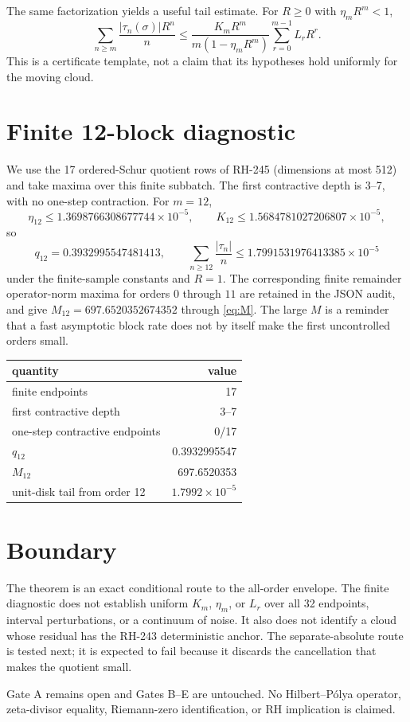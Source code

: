 \documentclass[11pt]{article}
\begin{document}
The same factorization yields a useful tail estimate.  For $R\ge0$ with
$\eta_mR^m<1$,
\begin{equation}\label{eq:tail}
 \sum_{n\ge m}\frac{|\tau_n(\sigma)|R^n}{n}
 \le
 \frac{K_mR^m}{m(1-\eta_mR^m)}
 \sum_{r=0}^{m-1}L_rR^r.
\end{equation}
This is a certificate template, not a claim that its hypotheses hold
uniformly for the moving cloud.

\section{Finite 12-block diagnostic}

We use the 17 ordered-Schur quotient rows of RH-245 (dimensions at most 512)
and take maxima over this finite subbatch.  The first contractive depth is
3--7, with no one-step contraction.  For $m=12$,
\[
 \eta_{12}\le1.3698766308677744\times10^{-5},\qquad
 K_{12}\le1.5684781027206807\times10^{-5},
\]
so
\[
 q_{12}=0.3932995547481413,
 \qquad
 \sum_{n\ge12}\frac{|\tau_n|}{n}
 \le1.7991531976413385\times10^{-5}
\]
under the finite-sample constants and $R=1$.  The corresponding finite
remainder operator-norm maxima for orders $0$ through $11$ are retained in
the JSON audit, and give $M_{12}=697.6520352674352$ through
\eqref{eq:M}.  The large $M$ is a reminder that a fast asymptotic block rate
does not by itself make the first uncontrolled orders small.

\begin{center}
\small
\begin{tabular}{lr}
\toprule
quantity & value\\
\midrule
finite endpoints & 17\\
first contractive depth & 3--7\\
one-step contractive endpoints & 0/17\\
$q_{12}$ & 0.3932995547\\
$M_{12}$ & 697.6520353\\
unit-disk tail from order 12 & $1.7992\times10^{-5}$\\
\bottomrule
\end{tabular}
\end{center}

\section{Boundary}

The theorem is an exact conditional route to the all-order envelope.  The
finite diagnostic does not establish uniform $K_m$, $\eta_m$, or $L_r$ over
all 32 endpoints, interval perturbations, or a continuum of noise.  It also
does not identify a cloud whose residual has the RH-243 deterministic anchor.
The separate-absolute route is tested next; it is expected to fail because
it discards the cancellation that makes the quotient small.

Gate A remains open and Gates B--E are untouched.  No Hilbert--P\'olya
operator, zeta-divisor equality, Riemann-zero identification, or RH
implication is claimed.



\end{document}
